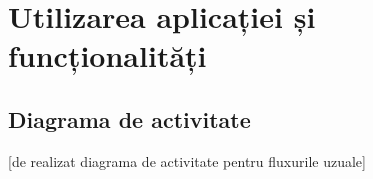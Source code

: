 \chapter{Utilizarea aplicației și funcționalități}

\section{Diagrama de activitate}

[de realizat diagrama de activitate pentru fluxurile uzuale]